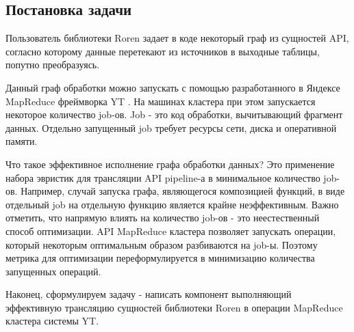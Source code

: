 \subsection{Постановка задачи}

Пользователь библиотеки Roren задает в коде некоторый граф из сущностей API, согласно которому данные перетекают из источников в выходные таблицы, попутно преобразуясь.

Данный граф обработки можно запускать с помощью разработанного в Яндексе MapReduce фреймворка YT \cite{yt}. На машинах кластера при этом запускается некоторое количество job-ов. Job \cite{job} - это код обработки, вычитывающий фрагмент данных. Отдельно запущенный job требует ресурсы сети, диска и оперативной памяти.

Что такое эффективное исполнение графа обработки данных? Это применение набора эвристик для трансляции API pipeline-а в  минимальное количество job-ов. Например, случай запуска графа, являющегося композицией функций, в виде отдельный job на отдельную функцию является крайне неэффективным. Важно отметить, что напрямую влиять на количество job-ов - это неестественный способ оптимизации. API MapReduce кластера позволяет запускать операции, который некоторым оптимальным образом разбиваются на job-ы.  Поэтому метрика для оптимизации переформулируется в минимизацию количества запущенных операций.

Наконец, сформулируем задачу - написать компонент выполняющий эффективную трансляцию сущностей библиотеки Roren в операции MapReduce кластера системы YT.
